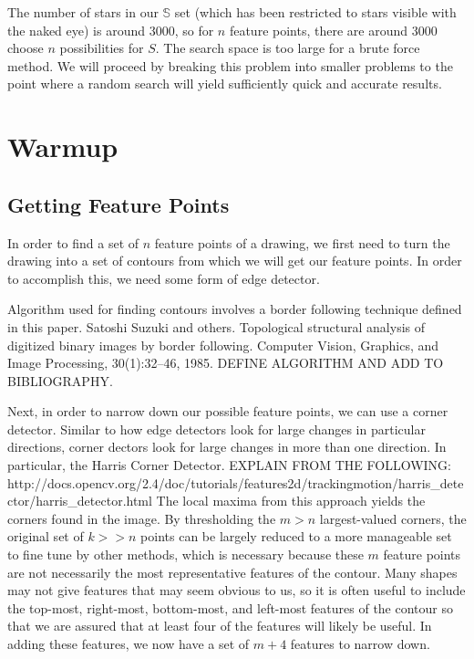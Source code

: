 \documentclass[paper=a4, fontsize=11pt]{scrartcl} %
\begin{document}
The number of stars in our $\mathbb{S}$ set (which has been restricted to stars visible with the naked eye) is around 3000, so for $n$ feature points, there are around 3000 choose $n$ possibilities for $S$. The search space is too large for a brute force method.  We will proceed by breaking this problem into smaller problems to the point where a random search will yield sufficiently quick and accurate results.
\section{Warmup}

\subsection{Getting Feature Points}

In order to find a set of $n$ feature points of a drawing, we first need to turn the drawing into a set of contours from which we will get our feature points. In order to accomplish this, we need some form of edge detector. 

Algorithm used for finding contours involves a border following technique defined in this paper. 
Satoshi Suzuki and others. Topological structural analysis of digitized binary images by border following. Computer Vision, Graphics, and Image Processing, 30(1):32–46, 1985. DEFINE ALGORITHM AND ADD TO BIBLIOGRAPHY. 

Next, in order to narrow down our possible feature points, we can use a corner detector. Similar to how edge detectors look for large changes in particular directions, corner dectors look for large changes in more than one direction. In particular, the Harris Corner Detector. EXPLAIN FROM THE FOLLOWING: http://docs.opencv.org/2.4/doc/tutorials/features2d/trackingmotion/harris_detector/harris_detector.html The local maxima from this approach yields the corners found in the image. By thresholding the $m > n$ largest-valued corners, the original set of $k >> n$ points can be largely reduced to a more manageable set to fine tune by other methods, which is necessary because these $m$ feature points are not necessarily the most representative features of the contour. Many shapes may not give features that may seem obvious to us, so it is often useful to include the top-most, right-most, bottom-most, and left-most features of the contour so that we are assured that at least four of the features will likely be useful. In adding these features, we now have a set of $m+4$ features to narrow down. 
\end{document}
